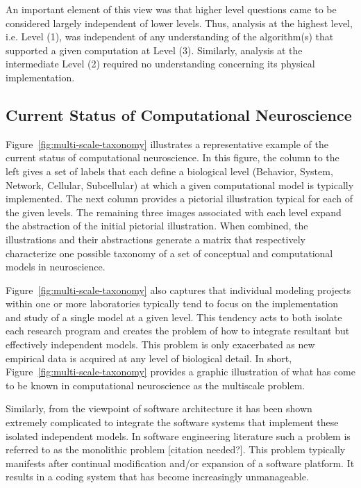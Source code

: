 \documentclass[11pt,3p,twocolumn]{JMN}
\begin{document}
An important element of this view was that higher level questions came to be considered largely independent of lower levels. Thus, analysis at the highest level, i.e. Level (1), was independent of any understanding of the algorithm(s) that supported a given computation at Level (3). Similarly, analysis at the intermediate Level (2) required no understanding concerning its physical implementation. 

\subsection{Current Status of Computational Neuroscience}

Figure~\ref{fig:multi-scale-taxonomy} illustrates a representative example of the current status of computational neuroscience. In this figure, the column to the left gives a set of labels that each define a biological level (Behavior, System, Network, Cellular, Subcellular) at which a given computational model is typically implemented. The next column provides a pictorial illustration typical for each of the given levels. The remaining three images associated with each level expand the abstraction of the initial pictorial illustration. When combined, the illustrations and their abstractions generate a matrix that respectively characterize one possible taxonomy of a set of conceptual and computational models in neuroscience.

Figure~\ref{fig:multi-scale-taxonomy} also captures that individual modeling projects within one or more laboratories typically tend to focus on the implementation and study of a single model at a given level. This tendency acts to both isolate each research program and creates the problem of how to integrate resultant but effectively independent models. This problem is only exacerbated as new empirical data is acquired at any level of biological detail.
In short, Figure~\ref{fig:multi-scale-taxonomy} provides a graphic illustration of what has come to be known in computational neuroscience as the multiscale problem.

Similarly, from the viewpoint of software architecture it has been shown extremely complicated to integrate the software systems that implement these isolated independent models.  In software engineering literature such a problem is referred to as the monolithic problem [citation needed?].
This problem typically manifests after continual modification and/or expansion of a software platform.  It results in a coding system that has become increasingly unmanageable.
\end{document}
